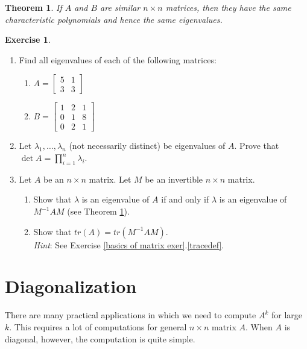 \documentclass[12pt,letterpaper]{book}
\numberwithin{equation}{section}
\newtheorem{thm}{\textbf{Theorem}}[section]
\theoremstyle{definition}
\newtheorem{exercise}{\textbf{Exercise}}[chapter]
\begin{document}
\begin{thm}\label{similar same} If $A$ and $B$ are similar $n\times n$ matrices,
then they have the same characteristic polynomials and
hence the same eigenvalues.
\end{thm}

\begin{exercise}\quad \label{char eq exer}
\begin{enumerate}[\bfseries 1.]

\item Find all eigenvalues of each of the following matrices:

\begin{enumerate}
\item $A=\left[\begin{array}{rr} 5 & 1 \\ 3 & 3 \end{array}\right]$
\item $B=\left[\begin{array}{rrr} 1 & 2 & 1 \\ 0 & 1 & 8 \\ 0 & 2 & 1\end{array}\right]$
\end{enumerate}


\item \label{prod equals det} Let $\lambda_1,\ldots,\lambda_n$ (not necessarily distinct) be eigenvalues of $A$. Prove that $\det A=\prod_{i=1}^n\lambda_i$.

\item Let $A$ be an $n\times n$ matrix. Let $M$ be an invertible $n\times n$ matrix.
\begin{enumerate}
\item Show that $\lambda$ is an eigenvalue of $A$ if and only if $\lambda$ is an eigenvalue of $M^{-1}AM$ (see Theorem \ref{similar same}).
\item Show that $tr(A)=tr(M^{-1}AM)$. \\\textit{Hint}: See Exercise \ref{basics of matrix exer}.\ref{tracedef}.
\end{enumerate}
\end{enumerate}
\end{exercise}

\section{Diagonalization}
There are many practical applications in which we need to
compute $A^k$ for large $k$. This requires a lot of computations for
general $n\times n$ matrix $A$. When $A$ is diagonal, however,
the computation is quite simple.
\end{document}
